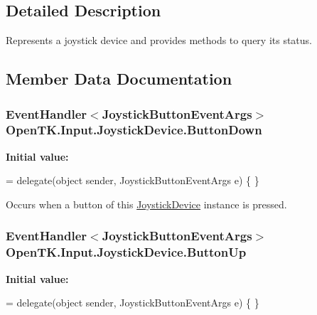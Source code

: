\subsection{Detailed Description}
Represents a joystick device and provides methods to query its status. 



\subsection{Member Data Documentation}
\hypertarget{class_open_t_k_1_1_input_1_1_joystick_device_a677045ca3c8a2ac98095680bb5746ede}{
\subsubsection[{Button\-Down}]{\setlength{\rightskip}{0pt plus 5cm}Event\-Handler$<${\bf Joystick\-Button\-Event\-Args}$>$ Open\-T\-K.\-Input.\-Joystick\-Device.\-Button\-Down}}\label{class_open_t_k_1_1_input_1_1_joystick_device_a677045ca3c8a2ac98095680bb5746ede}
{\bfseries Initial value\-:}
\begin{DoxyCode}
=
            delegate(\textcolor{keywordtype}{object} sender, JoystickButtonEventArgs e) \{ \}
\end{DoxyCode}


Occurs when a button of this \hyperlink{class_open_t_k_1_1_input_1_1_joystick_device}{Joystick\-Device} instance is pressed. 

\hypertarget{class_open_t_k_1_1_input_1_1_joystick_device_a837891423d49811a2384c95f7576fbc2}{
\subsubsection[{Button\-Up}]{\setlength{\rightskip}{0pt plus 5cm}Event\-Handler$<${\bf Joystick\-Button\-Event\-Args}$>$ Open\-T\-K.\-Input.\-Joystick\-Device.\-Button\-Up}}\label{class_open_t_k_1_1_input_1_1_joystick_device_a837891423d49811a2384c95f7576fbc2}
{\bfseries Initial value\-:}
\begin{DoxyCode}
=
            delegate(\textcolor{keywordtype}{object} sender, JoystickButtonEventArgs e) \{ \}
\end{DoxyCode}



